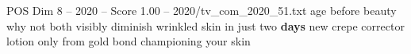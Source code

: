 \begin{textsample}{POS Dim 8 – 2020 – Score 1.00 – 2020/tv\_com\_2020\_51.txt}  \label{ex:f8_pos_029}
age before beauty why not both visibly diminish wrinkled skin in just two \textbf{days} new crepe corrector lotion only from gold bond championing your skin

\end{textsample}

